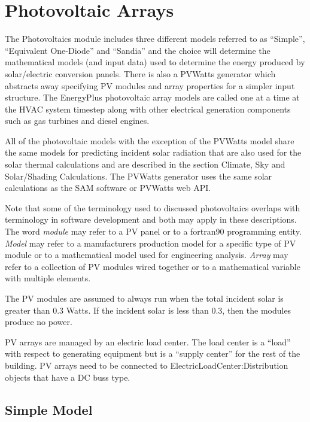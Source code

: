 \section{Photovoltaic Arrays}\label{photovoltaic-arrays}

The Photovoltaics module includes three different models referred to as ``Simple'', ``Equivalent One-Diode'' and ``Sandia'' and the choice will determine the mathematical models (and input data) used to determine the energy produced by solar/electric conversion panels. There is also a PVWatts generator which abstracts away specifying PV modules and array properties for a simpler input structure. The EnergyPlus photovoltaic array models are called one at a time at the HVAC system timestep along with other electrical generation components such as gas turbines and diesel engines.

All of the photovoltaic models with the exception of the PVWatts model share the same models for predicting incident solar radiation that are also used for the solar thermal calculations and are described in the section Climate, Sky and Solar/Shading Calculations. The PVWatts generator uses the same solar calculations as the SAM software or PVWatts web API. 

Note that some of the terminology used to discussed photovoltaics overlaps with terminology in software development and both may apply in these descriptions. The word \emph{module} may refer to a PV panel or to a fortran90 programming entity. \emph{Model} may refer to a manufacturers production model for a specific type of PV module or to a mathematical model used for engineering analysis. \emph{Array} may refer to a collection of PV modules wired together or to a mathematical variable with multiple elements.

The PV modules are assumed to always run when the total incident solar is greater than 0.3 Watts. If the incident solar is less than 0.3, then the modules produce no power.

PV arrays are managed by an electric load center. The load center is a ``load'' with respect to generating equipment but is a ``supply center'' for the rest of the building. PV arrays need to be connected to ElectricLoadCenter:Distribution objects that have a DC buss type.

\subsection{Simple Model}\label{simple-model}

